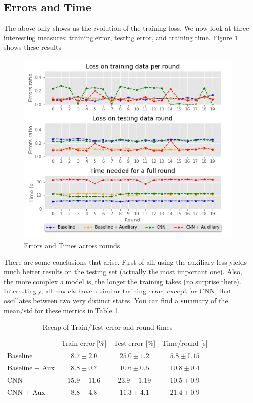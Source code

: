 \documentclass[10pt,conference]{IEEEtran}
\begin{document}
\subsection{Errors and Time}
The above only shows us the evolution of the training loss. We now look at three interesting measures: training error, testing error, and training time. Figure \ref{fig:err_time_rounds} shows these results
\begin{figure}
    \centering
    \includegraphics[scale=0.49]{../images/comparison.png}
    \caption{Errors and Times across rounds}
    \label{fig:err_time_rounds}
\end{figure}
There are some conclusions that arise. First of all, using the auxiliary loss yields much better results on the testing set (actually the most important one). Also, the more complex a model is, the longer the training takes (no surprise there). Interestingly, all models have a similar training error, except for CNN, that oscillates between two very distinct states. You can find a summary of the mean/std for these metrics in Table \ref{tab:recap}.
\begin{table}
    \begin{tabular}{l||ccc}
        & Train error [\%] & Test error [\%] & Time/round [s]\\
        Baseline & $8.7 \pm 2.0$ & $25.0 \pm 1.2 $ & $5.8 \pm 0.15$ \\
        \hline
        Baseline + Aux & $8.8 \pm 0.7$ & $10.6 \pm 0.5$ & $10.8 \pm 0.4$ \\
        \hline
        CNN & $15.9 \pm 11.6$ & $23.9 \pm 1.19$ & $10.5 \pm 0.9$ \\
        \hline
        CNN + Aux & $8.8 \pm 4.8$ & $11.3 \pm 4.1$ & $21.4 \pm 0.9$
    \end{tabular}
    \caption{Recap of Train/Test error and round times}
    \label{tab:recap}
\end{table}
\end{document}

